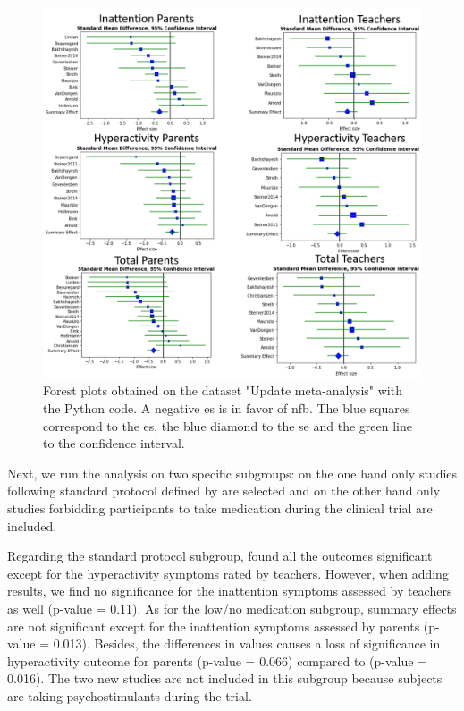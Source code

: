 \begin{figure}[h!]
  \centering
  \includegraphics[width=1.0\linewidth]{figures/meta_review_forest_plots_update_meta_analysis_our_choices_no_colors_2-columns_fitting_image}
  \caption{Forest plots obtained on the dataset "Update meta-analysis" with the Python code. A negative \gls{es} is in favor of \gls{nfb}. 
	The blue squares correspond to the \gls{es}, the blue diamond to the \gls{se} and the green line to the confidence interval.}
  \label{Figure:meta_review_forest_plots_update_meta_analysis_our_choices_no_colors_2-columns_fitting_image}
\end{figure}

Next, we run the analysis on two specific subgroups: on the one hand only studies following standard protocol defined by \citet{Arns2014}
are selected and on the other hand only studies forbidding participants to take medication during the clinical trial are included. 

Regarding the standard protocol subgroup, \citet{Cortese2016} found all the outcomes significant except for the hyperactivity symptoms 
rated by teachers. However, when adding \citep{Strehl2017} results, we find no significance for the inattention symptoms assessed by 
teachers as well (p-value = 0.11). 
As for the low/no medication subgroup, summary effects are not significant except for the inattention symptoms assessed by parents (p-value = 0.013). 
Besides, the differences in \citet{Arnold2014} values causes a loss of significance in 
hyperactivity outcome for parents (p-value = 0.066) compared to \citet{Cortese2016} (p-value = 0.016). The two new studies are not 
included in this subgroup because subjects are taking psychostimulants during the trial.

